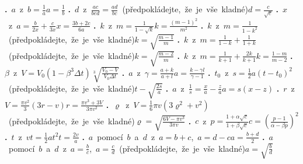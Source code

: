 \documentclass[12pt,a4paper]{extarticle}
\def\priklad#1#2{\advance\pr1\nointerlineskip\vbox to.0587\vsize{\vss\hbox{{\Large\bfseries \tym\ifnum\pr<10 0\fi\the\pr}\quad#1}\vss}\vfil}
\def\printtym#1{\pr0\def\tym{#1}\priklady\vfill\newpage}
\def\priklad#1#2{\advance\pr1 \hbox{\textbf{\the\pr.} #1\qquad #2}\bigskip}
\def\predp{ (předpokládejte, že je vše kladné)}
\begin{document}
\def\priklady{%
\priklad{$a$ z $b = \frac1a$}{$a = \frac1b$}
\priklad{$d$ z $\frac{ac}{bed} = \frac{ad}{bc}$ (předpokládejte, že je vše kladné)}{$d = \frac{c}{\sqrt e}$}
\priklad{$x$ z $a = \frac{b}{2x} + \frac{c}{3x}$}{$x = \frac{3b+2c}{6a}$}
\priklad{$k$ z $m = \frac{1}{1-\sqrt{k}}$}{$k = \frac{(m-1)^2}{m^2}$}
\priklad{$k$ z $m = \frac{1}{1-k^2}$ (předpokládejte, že je vše kladné)}{$k = \sqrt{\frac{m-1}{m}}$}
\priklad{$k$ z $m = \frac{1}{1-k} + \frac{1}{1+k}$\predp}{$k = \sqrt{\frac{m-2}{m}}$}
\priklad{$k$ z $m = \frac{1}{k+1} + \frac{2k}{k+1}$}{$k = \frac{1-m}{m-2}$}
\priklad{$\beta$ z $V = V_0(1-\beta^3 \Delta t)$}{$\sqrt[3]{\frac{V_0-V}{V_0 \Delta t}}$}
\priklad{$a$ z $\gamma = \frac{a+k}{a+l}$}{$a = \frac{k - \gamma l}{\gamma - 1}$}
\priklad{$t_0$ z $s = \frac12 a (t-t_0)^2$\predp}{$t - \sqrt{\frac{2s}{a}}$}
\priklad{$a$ z $\frac{1}{s} = \frac xa - \frac za$}{$a = s(x-z)$}
\priklad{$r$ z $V = \frac{\pi v^2}{3}(3r - v)$}{$r = \frac{\pi  v^3+3 V}{3 \pi  v^2}$}
\priklad{$\varrho$ z $V = \frac16 \pi v(3\varrho^2 + v^2)$\predp}{$\varrho=\sqrt{\frac{6V-\pi v^3}{3\pi v}}$}
\priklad{$c$ z $p = \frac{1 + \alpha \sqrt c}{1 + \beta \sqrt c}$}{$c = \left(\frac{p-1}{\alpha-\beta p}\right)^2$}
\priklad{$t$ z $v t = \frac12 a t^2$}{$t = \frac{2v}{a}$}
\priklad{$a$ pomocí $b$ a $d$ z $a = b + c$, $a = d - c$}{$a = \frac{b + d}{2}$}
\priklad{$a$ pomocí $b$ a $d$ z $a = \frac{b}{c}$, $a = \frac{c}{d}$\predp}{$a = \sqrt{\frac bd}$}
}


\printtym{A}
\end{document}
